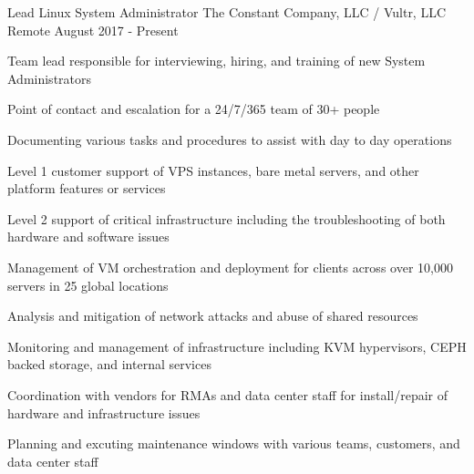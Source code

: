 
\begin{cventries}

	\cventry
	{Lead Linux System Administrator}
	{The Constant Company, LLC / Vultr, LLC}
	{Remote}
	{August 2017 - Present}
	{
		\begin{cvitems}
		\item {Team lead responsible for interviewing, hiring, and training of new System Administrators}
  		\item {Point of contact and escalation for a 24/7/365 team of 30+ people} 
		\item {Documenting various tasks and procedures to assist with day to day operations}
		\item {Level 1 customer support of VPS instances, bare metal servers, and other platform features or services}
		\item {Level 2 support of critical infrastructure including the troubleshooting of both hardware and software issues}
		\item {Management of VM orchestration and deployment for clients across over 10,000 servers in 25 global locations}
		\item {Analysis and mitigation of network attacks and abuse of shared resources}
		\item {Monitoring and management of infrastructure including KVM hypervisors,  CEPH backed storage, and internal services}
		\item {Coordination with vendors for RMAs and data center staff for install/repair of hardware and infrastructure issues}
		\item {Planning and excuting maintenance windows with various teams, customers, and data center staff}
		\end{cvitems}
	}



\end{cventries}
